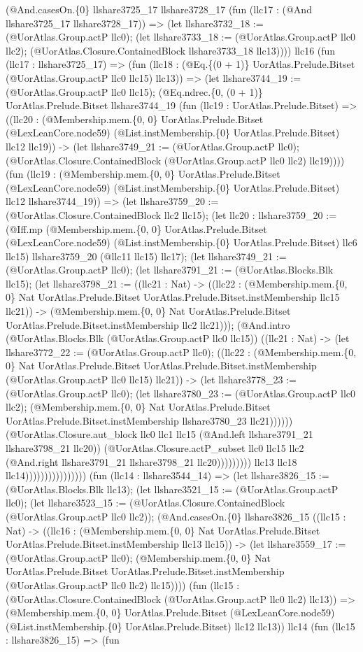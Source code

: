 \documentclass[11pt]{article}
\begin{document}
(@And.casesOn.\{0\} llshare3725\_17 llshare3728\_17 (fun (llc17 : (@And llshare3725\_17 llshare3728\_17)) => (let llshare3732\_18 := (@UorAtlas.Group.actP llc0); (let llshare3733\_18 := (@UorAtlas.Group.actP llc0 llc2); (@UorAtlas.Closure.ContainedBlock llshare3733\_18 llc13)))) llc16 (fun (llc17 : llshare3725\_17) => (fun (llc18 : (@Eq.\{(0 + 1)\} UorAtlas.Prelude.Bitset (@UorAtlas.Group.actP llc0 llc15) llc13)) => (let llshare3744\_19 := (@UorAtlas.Group.actP llc0 llc15); (@Eq.ndrec.\{0, (0 + 1)\} UorAtlas.Prelude.Bitset llshare3744\_19 (fun (llc19 : UorAtlas.Prelude.Bitset) => ((llc20 : (@Membership.mem.\{0, 0\} UorAtlas.Prelude.Bitset (@LexLeanCore.node59) (@List.instMembership.\{0\} UorAtlas.Prelude.Bitset) llc12 llc19)) -> (let llshare3749\_21 := (@UorAtlas.Group.actP llc0); (@UorAtlas.Closure.ContainedBlock (@UorAtlas.Group.actP llc0 llc2) llc19)))) (fun (llc19 : (@Membership.mem.\{0, 0\} UorAtlas.Prelude.Bitset (@LexLeanCore.node59) (@List.instMembership.\{0\} UorAtlas.Prelude.Bitset) llc12 llshare3744\_19)) => (let llshare3759\_20 := (@UorAtlas.Closure.ContainedBlock llc2 llc15); (let llc20 : llshare3759\_20 := (@Iff.mp (@Membership.mem.\{0, 0\} UorAtlas.Prelude.Bitset (@LexLeanCore.node59) (@List.instMembership.\{0\} UorAtlas.Prelude.Bitset) llc6 llc15) llshare3759\_20 (@llc11 llc15) llc17); (let llshare3749\_21 := (@UorAtlas.Group.actP llc0); (let llshare3791\_21 := (@UorAtlas.Blocks.Blk llc15); (let llshare3798\_21 := ((llc21 : Nat) -> ((llc22 : (@Membership.mem.\{0, 0\} Nat UorAtlas.Prelude.Bitset UorAtlas.Prelude.Bitset.instMembership llc15 llc21)) -> (@Membership.mem.\{0, 0\} Nat UorAtlas.Prelude.Bitset UorAtlas.Prelude.Bitset.instMembership llc2 llc21))); (@And.intro (@UorAtlas.Blocks.Blk (@UorAtlas.Group.actP llc0 llc15)) ((llc21 : Nat) -> (let llshare3772\_22 := (@UorAtlas.Group.actP llc0); ((llc22 : (@Membership.mem.\{0, 0\} Nat UorAtlas.Prelude.Bitset UorAtlas.Prelude.Bitset.instMembership (@UorAtlas.Group.actP llc0 llc15) llc21)) -> (let llshare3778\_23 := (@UorAtlas.Group.actP llc0); (let llshare3780\_23 := (@UorAtlas.Group.actP llc0 llc2); (@Membership.mem.\{0, 0\} Nat UorAtlas.Prelude.Bitset UorAtlas.Prelude.Bitset.instMembership llshare3780\_23 llc21)))))) (@UorAtlas.Closure.aut\_block llc0 llc1 llc15 (@And.left llshare3791\_21 llshare3798\_21 llc20)) (@UorAtlas.Closure.actP\_subset llc0 llc15 llc2 (@And.right llshare3791\_21 llshare3798\_21 llc20))))))))) llc13 llc18 llc14)))))))))))))))) (fun (llc14 : llshare3544\_14) => (let llshare3826\_15 := (@UorAtlas.Blocks.Blk llc13); (let llshare3521\_15 := (@UorAtlas.Group.actP llc0); (let llshare3523\_15 := (@UorAtlas.Closure.ContainedBlock (@UorAtlas.Group.actP llc0 llc2)); (@And.casesOn.\{0\} llshare3826\_15 ((llc15 : Nat) -> ((llc16 : (@Membership.mem.\{0, 0\} Nat UorAtlas.Prelude.Bitset UorAtlas.Prelude.Bitset.instMembership llc13 llc15)) -> (let llshare3559\_17 := (@UorAtlas.Group.actP llc0); (@Membership.mem.\{0, 0\} Nat UorAtlas.Prelude.Bitset UorAtlas.Prelude.Bitset.instMembership (@UorAtlas.Group.actP llc0 llc2) llc15)))) (fun (llc15 : (@UorAtlas.Closure.ContainedBlock (@UorAtlas.Group.actP llc0 llc2) llc13)) => (@Membership.mem.\{0, 0\} UorAtlas.Prelude.Bitset (@LexLeanCore.node59) (@List.instMembership.\{0\} UorAtlas.Prelude.Bitset) llc12 llc13)) llc14 (fun (llc15 : llshare3826\_15) => (fun 
\end{document}
